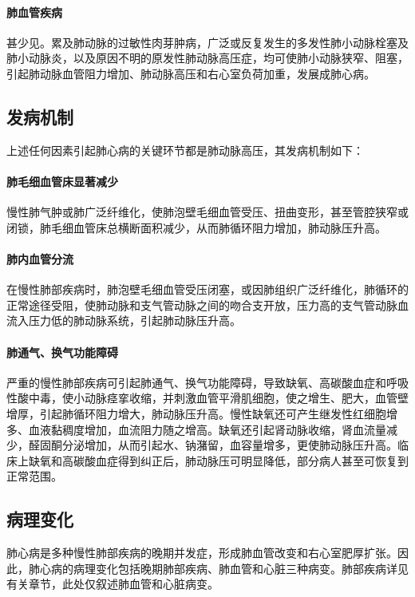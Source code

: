 \paragraph{肺血管疾病}
甚少见。累及肺动脉的过敏性肉芽肿病，广泛或反复发生的多发性肺小动脉栓塞及肺小动脉炎，以及原因不明的原发性肺动脉高压症，均可使肺小动脉狭窄、阻塞，引起肺动脉血管阻力增加、肺动脉高压和右心室负荷加重，发展成肺心病。

\subsection{发病机制}

上述任何因素引起肺心病的关键环节都是肺动脉高压，其发病机制如下：

\paragraph{肺毛细血管床显著减少}
慢性肺气肿或肺广泛纤维化，使肺泡壁毛细血管受压、扭曲变形，甚至管腔狭窄或闭锁，肺毛细血管床总横断面积减少，从而肺循环阻力增加，肺动脉压升高。

\paragraph{肺内血管分流}
在慢性肺部疾病时，肺泡壁毛细血管受压闭塞，或因肺组织广泛纤维化，肺循环的正常途径受阻，使肺动脉和支气管动脉之间的吻合支开放，压力高的支气管动脉血流入压力低的肺动脉系统，引起肺动脉压升高。

\paragraph{肺通气、换气功能障碍}
严重的慢性肺部疾病可引起肺通气、换气功能障碍，导致缺氧、高碳酸血症和呼吸性酸中毒，使小动脉痉挛收缩，并刺激血管平滑肌细胞，使之增生、肥大，血管壁增厚，引起肺循环阻力增大，肺动脉压升高。慢性缺氧还可产生继发性红细胞增多、血液黏稠度增加，血流阻力随之增高。缺氧还引起肾动脉收缩，肾血流量减少，醛固酮分泌增加，从而引起水、钠潴留，血容量增多，更使肺动脉压升高。临床上缺氧和高碳酸血症得到纠正后，肺动脉压可明显降低，部分病人甚至可恢复到正常范围。

\subsection{病理变化}

肺心病是多种慢性肺部疾病的晚期并发症，形成肺血管改变和右心室肥厚扩张。因此，肺心病的病理变化包括晚期肺部疾病、肺血管和心脏三种病变。肺部疾病详见有关章节，此处仅叙述肺血管和心脏病变。

